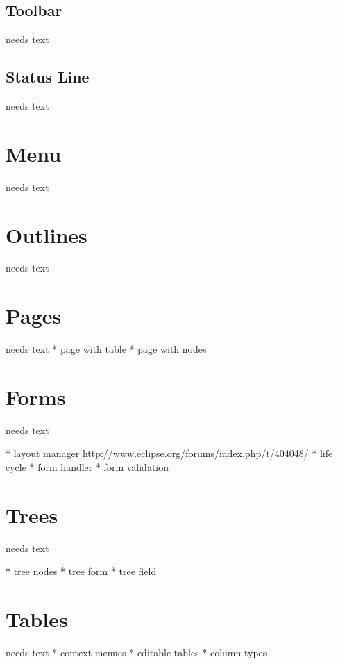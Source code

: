 \documentclass[a4paper,10pt,twoside]{book}
\begin{document}
\subsection{Toolbar}
needs text

\subsection{Status Line}
needs text

\section{Menu}
needs text

\section{Outlines}
needs text

\section{Pages}
needs text
    * page with table
	* page with nodes

\section{Forms}
needs text

    * layout manager \url{http://www.eclipse.org/forums/index.php/t/404048/}
    * life cycle
	* form handler
	* form validation

\section{Trees}
needs text

    * tree nodes
	* tree form
	* tree field

\section{Tables}
needs text
	* context menues
	* editable tables
    * column types
\end{document}
